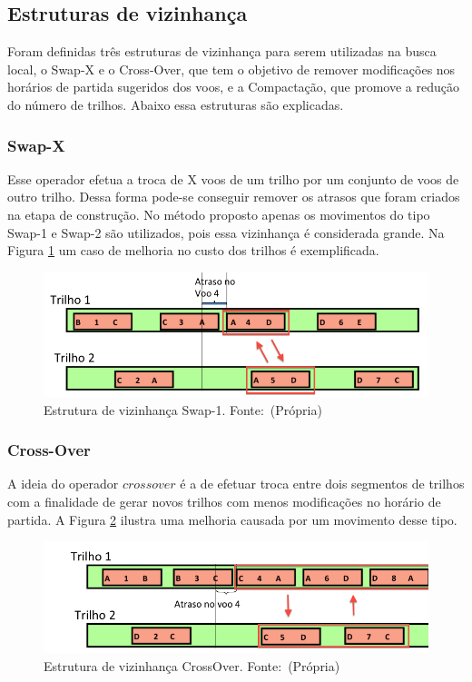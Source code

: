 \subsection{Estruturas de vizinhança}
 
Foram definidas três estruturas de vizinhança para serem utilizadas na busca
local, o Swap-X e o Cross-Over, que tem o objetivo de remover modificações nos
horários de partida sugeridos dos voos, e a Compactação, que promove a redução
do número de trilhos. Abaixo essa estruturas são explicadas.
 
\subsubsection{Swap-X}

Esse operador efetua a troca de X voos de um trilho por um conjunto de voos de
outro trilho. Dessa forma pode-se conseguir remover os atrasos que foram criados
na etapa de construção. No método proposto apenas os movimentos do tipo Swap-1
e Swap-2 são utilizados, pois essa vizinhança é considerada grande. Na Figura
\ref{fig:swap1} um caso de melhoria no custo dos trilhos é exemplificada.

\begin{figure}[ht]
	\caption{Estrutura de vizinhança Swap-1. \newline \mbox{Fonte:
	(Própria)}}\label{fig:swap1}
	\includegraphics[scale=0.4]{./img/swap-1}
	
\end{figure}
 
 \subsubsection{Cross-Over}
 
A ideia do operador $crossover$ é a de efetuar troca entre dois segmentos de
trilhos com a finalidade de gerar novos trilhos com menos modificações no
horário de partida. A Figura \ref{fig:crossover} ilustra uma melhoria causada por um
movimento desse tipo.


\begin{figure}[ht]
	\caption{Estrutura de vizinhança CrossOver. \newline \mbox{Fonte:
	(Própria)}}\label{fig:crossover}
	\includegraphics[scale=0.4]{./img/crossover}
	
\end{figure}
 
